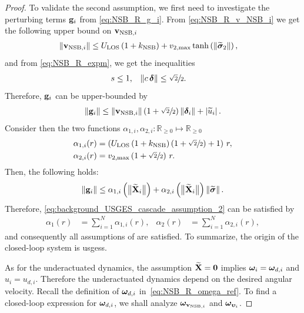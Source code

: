 \begin{proof}
    To validate the second assumption, we first need to investigate the perturbing terms $\mathbf{g}_i$ from \eqref{eq:NSB_R_g_i}.
    From \eqref{eq:NSB_R_v_NSB_i} we get the following upper bound on $\mathbf{v}_{{\rm NSB}, i}$ 
    \begin{align}
        \left\|\mathbf{v}_{{\rm NSB}, i}\right\| &\leq U_{\rm LOS}\left(1 + k_{\rm NSB}\right) + v_{2, \max}\tanh\left(\left\|\widetilde{\bm{\sigma}}_2\right\|\right),
    \end{align}
    and from \eqref{eq:NSB_R_expm}, we get the inequalities 
    \begin{align}
        s &\leq 1, &
        \left\|c\,\bm{\delta}\right\| &\leq \sfrac{\sqrt{2}}{2}.
    \end{align}
    Therefore, $\mathbf{g}_i$ can be upper-bounded by 
    \begin{equation}
        \left\|\mathbf{g}_i\right\| \leq \left\|\mathbf{v}_{{\rm NSB}, i}\right\|\left(1 + \sfrac{\sqrt{2}}{2}\right)\left\|\bm{\delta}_i\right\| + \left|\widetilde{u}_i\right|.
    \end{equation}
    Consider then the two functions $\alpha_{1,i}, \alpha_{2,i} : \mathbb{R}_{\geq 0} \mapsto \mathbb{R}_{\geq 0}$ 
    \begin{align}
        \alpha_{1,i}(r) &= \left(U_{\rm LOS}\left(1 + k_{\rm NSB}\right)\left(1 + \sfrac{\sqrt{2}}{2}\right) + 1\right)\,r, \\
        \alpha_{2,i}(r) &= v_{2, \max}\left(1 + \sfrac{\sqrt{2}}{2}\right)\,r.
    \end{align}
    Then, the following holds: 
    \begin{equation}
        \left\|\mathbf{g}_i\right\| \leq \alpha_{1,i}\left(\bigl\|\widetilde{\mathbf{X}}_i\bigr\|\right) + 
                            \alpha_{2,i}\left(\bigl\|\widetilde{\mathbf{X}}_i\bigr\|\right)\left\|\widetilde{\bm{\sigma}}\right\|. \label{eq:NSB_R_perturbing_term}
    \end{equation}
    Therefore, \eqref{eq:background_USGES_cascade_assumption_2} can be satisfied by 
    \begin{align}
        \alpha_1(r) &= \sum_{i=1}^N \alpha_{1,i}(r), &
        \alpha_2(r) &= \sum_{i=1}^N \alpha_{2,i}(r),
    \end{align}
    and consequently all assumptions of \cite[Proposition~9]{pettersen_lyapunov_2017} are satisfied. To summarize, the origin of the closed-loop system is \glspl{usges}.

    

    As for the underactuated dynamics, the assumption $\widetilde{\mathbf{X}} = \mathbf{0}$ implies $\bm{\omega}_i = \bm{\omega}_{d, i}$ and $u_i = u_{d, i}$.
    Therefore the underactuated dynamics depend on the desired angular velocity.
    Recall the definition of $\bm{\omega}_{d, i}$ in~\eqref{eq:NSB_R_omega_ref}.
    To find a closed-loop expression for $\bm{\omega}_{d, i}$, we shall analyze $\bm{\omega}_{\mathbf{v}_{{\rm NSB}, i}}$ and $\bm{\omega}_{\bm{\upsilon}_{i}}$.


\end{proof}

